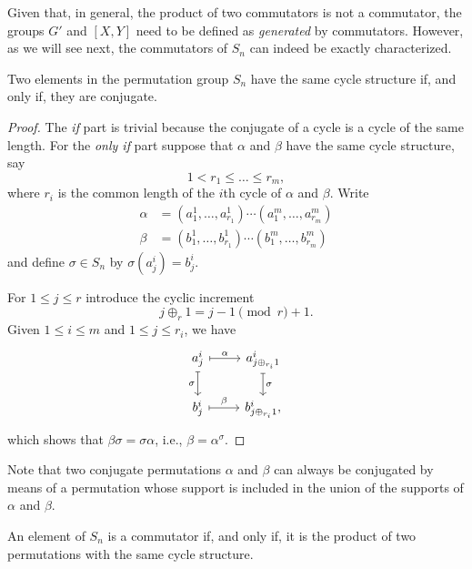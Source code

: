 \begin{rem}
    Given that, in general, the product of two commutators is not a commutator, the groups\/ $G'$ and\/ $[X,Y]$ need to be defined as \textsl{generated\/} by commutators. However, as we will see next, the commutators of\/ $S_n$ can indeed be exactly characterized.
\end{rem}


\begin{lem}
    Two elements in the permutation group $S_n$ have the same cycle structure if, and only if, they are conjugate.
\end{lem}

\begin{proof} The \textit{if\/} part is trivial because the conjugate of a cycle is a cycle of the same length. For the \textit{only if\/} part suppose that $\alpha$ and $\beta$ have the same cycle structure, say 
$$
    1<r_1\le\dots\le r_m,
$$
where $r_i$ is the common length of the $i$th cycle of $\alpha$ and $\beta$. Write
\begin{align*}
    \alpha &= (a^1_1,\dots,a^1_{r_1})\cdots(a^m_1,\dots,a^m_{r_m})\\
    \beta &= (b^1_1,\dots,b^1_{r_1})\cdots(b^m_1,\dots,b^m_{r_m})
\end{align*}
and define $\sigma\in S_n$ by $\sigma(a^i_j)=b^i_j$.

For $1\le j\le r$ introduce the cyclic increment
$$
    j\oplus_r1=j-1\pmod r+1.
$$
Given $1\le i\le m$ and $1\le j\le r_i$, we have
$$
    \begin{tikzcd}
        a^i_j
                \arrow[r,"\alpha",mapsto]
                \arrow[d,"\sigma"',mapsto]
            &a^i_{j\oplus_{r_i}1}
                \arrow[d,"\sigma",mapsto]\\
        b^i_j
                \arrow[r,"\beta",mapsto]
            &b^i_{j\oplus_{r_i}1},
    \end{tikzcd}
$$
which shows that $\beta\sigma=\sigma\alpha$, i.e., $\beta=\alpha^\sigma$.
\end{proof}

\begin{rem}
    Note that two conjugate permutations\/ $\alpha$ and\/ $\beta$ can always be conjugated by means of a permutation whose support is included in the union of the supports of\/ $\alpha$ and\/ $\beta$.
\end{rem}

\begin{lem}
    An element of\/ $S_n$ is a commutator if, and only if, it is the product of two permutations with the same cycle structure.
\end{lem}

